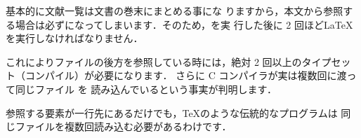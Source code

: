 \begin{Trick}
基本的に文献一覧は文書の巻末にまとめる事にな
りますから，本文から参照する場合は必ずになってしまいます．そのため，\BibTeX を実
行した後に 2 回ほど\LaTeX を実行しなければなりません．
\end{Trick}

\begin{Prob}
これによりファイルの後方を参照している時には，絶対
2 回以上のタイプセット（コンパイル）が必要になります．
さらに C コンパイラが実は複数回に渡って同じファイル  を
読み込んでいるという事実が判明します．


参照する要素が一行先にあるだけでも，\TeX のような伝統的なプログラムは
同じファイルを複数回読み込む必要があるわけです．


\end{Prob}

